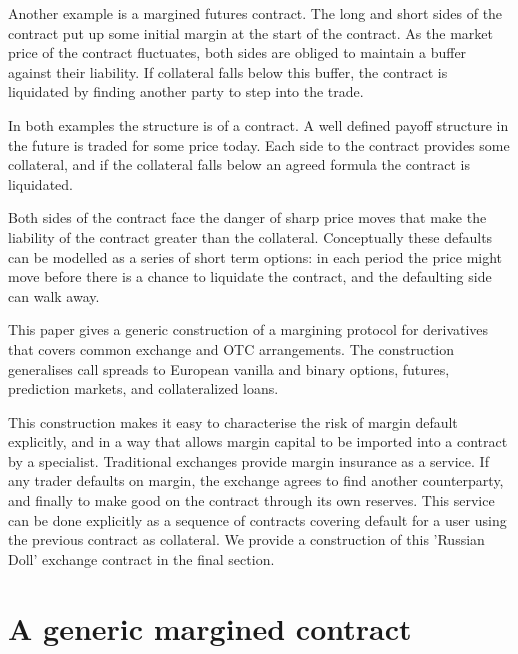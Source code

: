 \documentclass[12pt]{article}
\begin{document}
Another example is a margined futures contract. The long and short sides of the contract put up some initial margin at the start of the contract. As the market price of the contract fluctuates, both sides are obliged to maintain a buffer against their liability. If collateral falls below this buffer, the contract is liquidated by finding another party to step into the trade. 

In both examples the structure is of a contract. A well defined payoff structure in the future is traded for some price today. Each side to the contract provides some collateral, and if the collateral falls below an agreed formula the contract is liquidated.

Both sides of the contract face the danger of sharp price moves that make the liability of the contract greater than the collateral. Conceptually these defaults can be modelled as a series of short term options: in each period the price might move before there is a chance to liquidate the contract, and the defaulting side can walk away. 

This paper gives a generic construction of a margining protocol for derivatives that covers common exchange and OTC arrangements. The construction generalises call spreads to European vanilla and binary options, futures, prediction markets, and collateralized loans. 


This construction makes it easy to characterise the risk of margin default explicitly, and in a way that allows margin capital to be imported into a contract by a specialist. Traditional exchanges provide margin insurance as a service. If any trader defaults on margin, the exchange agrees to find another counterparty, and finally to make good on the contract through its own reserves.  This service can be done explicitly as a sequence of contracts covering default for a user using the previous contract as collateral. We provide a construction of this 'Russian Doll' exchange contract in the final section.


\section{A generic margined contract } \label{genericcontracts}
\end{document}
